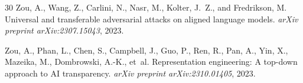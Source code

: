 \documentclass[11pt]{article}
\begin{document}
\begin{thebibliography}{30}
Zou, A., Wang, Z., Carlini, N., Nasr, M., Kolter, J.~Z., and Fredrikson, M.
\newblock Universal and transferable adversarial attacks on aligned language models.
\newblock \emph{arXiv preprint arXiv:2307.15043}, 2023.

Zou, A., Phan, L., Chen, S., Campbell, J., Guo, P., Ren, R., Pan, A., Yin, X., Mazeika, M., Dombrowski, A.-K., et~al.
\newblock Representation engineering: A top-down approach to {AI} transparency.
\newblock \emph{arXiv preprint arXiv:2310.01405}, 2023.

\end{thebibliography}
\end{document}
